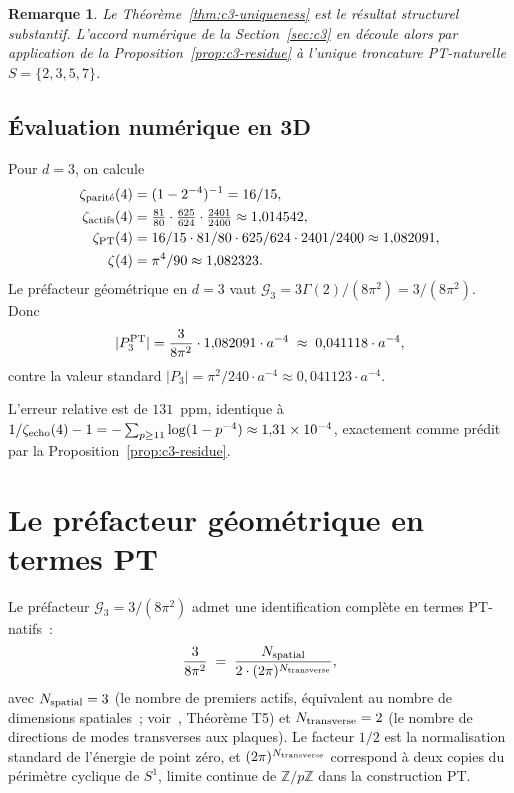 \documentclass[11pt,a4paper]{article}
\newtheorem{remarque}{Remarque}
\newcommand{\PTset}{\{2,3,5,7\}}
\newcommand{\Nspatial}{N_{\rm spatial}}
\newcommand{\Ntrans}{N_{\rm transverse}}
\begin{document}
\begin{remarque}
Le Théorème~\ref{thm:c3-uniqueness} est le résultat structurel substantif. L'accord numérique
de la Section~\ref{sec:c3} en découle alors par application de la
Proposition~\ref{prop:c3-residue} à l'unique troncature PT-naturelle $S = \PTset$.
\end{remarque}

\subsection{Évaluation numérique en 3D}

Pour $d = 3$, on calcule
\begin{align*}
\zeta_{\rm parit\acute{e}}(4) &= (1 - 2^{-4})^{-1} = 16/15,\\
\zeta_{\rm actifs}(4) &= \tfrac{81}{80} \cdot \tfrac{625}{624} \cdot \tfrac{2401}{2400} \approx 1{,}014542,\\
\zeta_{\rm PT}(4) &= 16/15 \cdot 81/80 \cdot 625/624 \cdot 2401/2400 \approx 1{,}082091,\\
\zeta(4) &= \pi^{4}/90 \approx 1{,}082323.
\end{align*}
Le préfacteur géométrique en $d = 3$ vaut
$\mathcal{G}_{3} = 3 \Gamma(2)/(8\pi^{2}) = 3/(8\pi^{2})$. Donc
\[
|P_{3}^{\rm PT}| = \frac{3}{8\pi^{2}} \cdot 1{,}082091 \cdot a^{-4}
\;\approx\; 0{,}041118 \cdot a^{-4},
\]
contre la valeur standard $|P_{3}| = \pi^{2}/240 \cdot a^{-4} \approx 0{,}041123 \cdot a^{-4}$.

L'erreur relative est de $131$~ppm, identique à $1/\zeta_{\rm echo}(4) - 1 = -\sum_{p \geq 11}\log(1-p^{-4}) \approx 1{,}31 \times 10^{-4}$, exactement comme prédit par la Proposition~\ref{prop:c3-residue}.

\section{Le préfacteur géométrique en termes PT}
\label{sec:prefactor}

Le préfacteur $\mathcal{G}_{3} = 3/(8\pi^{2})$ admet une identification complète en termes
PT-natifs~:
\begin{equation}
\frac{3}{8\pi^{2}} \;=\; \frac{\Nspatial}{2 \cdot (2\pi)^{\Ntrans}},
\label{eq:prefactor-pt}
\end{equation}
avec $\Nspatial = 3$ (le nombre de premiers actifs, équivalent au nombre de dimensions spatiales~;
voir~\cite{Senez2026}, Théorème T5) et $\Ntrans = 2$ (le nombre de directions de modes transverses
aux plaques). Le facteur $1/2$ est la normalisation standard de l'énergie de point zéro, et
$(2\pi)^{\Ntrans}$ correspond à deux copies du périmètre cyclique de $S^{1}$, limite continue de
$\mathbb{Z}/p\mathbb{Z}$ dans la construction PT.
\end{document}
